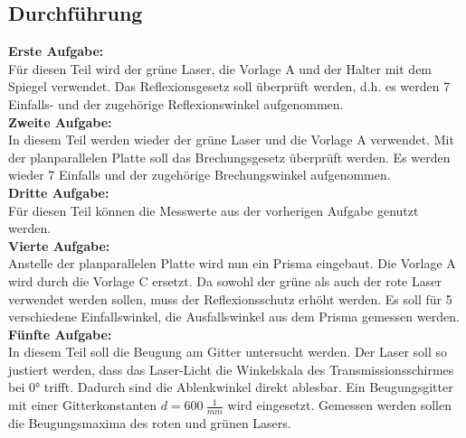 \subsection{Durchführung}
\textbf{Erste Aufgabe:}\\
Für diesen Teil wird der grüne Laser, die Vorlage A und der Halter mit dem Spiegel verwendet. Das Reflexionsgesetz soll überprüft werden, d.h. es werden
7 Einfalls- und der zugehörige Reflexionswinkel aufgenommen.\\
\textbf{Zweite Aufgabe:}\\
In diesem Teil werden wieder der grüne Laser und die Vorlage A verwendet. Mit der planparallelen Platte soll das Brechungsgesetz überprüft werden.
Es werden wieder 7 Einfalls und der zugehörige Brechungswinkel aufgenommen.\\
\textbf{Dritte Aufgabe:}\\
Für diesen Teil können die Messwerte aus der vorherigen Aufgabe genutzt werden.\\
\textbf{Vierte Aufgabe:}\\
Anstelle der planparallelen Platte wird nun ein Prisma eingebaut. Die Vorlage A wird durch die Vorlage C ersetzt. Da sowohl der grüne als auch der rote Laser
verwendet werden sollen, muss der Reflexionsschutz erhöht werden. Es soll für 5 verschiedene Einfallswinkel, die Ausfallswinkel aus dem Prisma gemessen werden.\\
\textbf{Fünfte Aufgabe:}\\
In diesem Teil soll die Beugung am Gitter untersucht werden. Der Laser soll so justiert werden, dass das Laser-Licht die Winkelskala des Transmissionsschirmes
bei 0° trifft. Dadurch sind die Ablenkwinkel direkt ablesbar. Ein Beugungsgitter mit einer Gitterkonstanten $d = \SI{600}{\frac{1}{mm}}$ wird eingesetzt. 
Gemessen werden sollen die Beugungsmaxima des roten und grünen Lasers.
\newpage